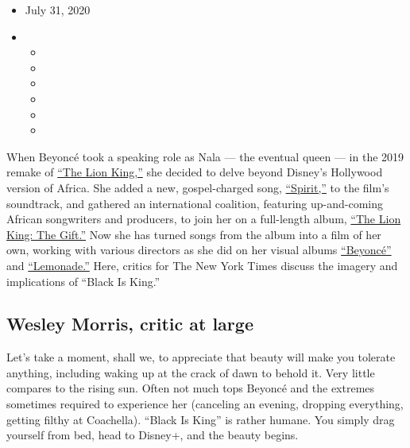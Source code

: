 \begin{itemize}
\item
  July 31, 2020
\item
  \begin{itemize}
  \item
  \item
  \item
  \item
  \item
  \item
  \end{itemize}
\end{itemize}

When Beyoncé took a speaking role as Nala --- the eventual queen --- in
the 2019 remake of
\href{https://www.nytimes.com/2019/07/11/movies/the-lion-king-review.html}{``The
Lion King,''} she decided to delve beyond Disney's Hollywood version of
Africa. She added a new, gospel-charged song,
\href{https://www.nytimes.com/2019/07/12/arts/music/playlist-beyonce-billie-eilish-justin-bieber-ed-sheeran.html}{``Spirit,''}
to the film's soundtrack, and gathered an international coalition,
featuring up-and-coming African songwriters and producers, to join her
on a full-length album,
\href{https://www.nytimes.com/2019/07/24/arts/music/beyonce-the-lion-king-the-gift-review.html}{``The
Lion King: The Gift.''} Now she has turned songs from the album into a
film of her own, working with various directors as she did on her visual
albums
\href{https://www.nytimes.com/2013/12/14/arts/music/beyonces-new-album-is-steamy-and-sleek.html}{``Beyoncé''}
and
\href{https://www.nytimes.com/2016/04/25/arts/music/beyonce-lemonade.html}{``Lemonade.''}
Here, critics for The New York Times discuss the imagery and
implications of ``Black Is King.''

\hypertarget{wesley-morris-critic-at-large}{%
\subsection{Wesley Morris, critic at
large}\label{wesley-morris-critic-at-large}}

Let's take a moment, shall we, to appreciate that beauty will make you
tolerate anything, including waking up at the crack of dawn to behold
it. Very little compares to the rising sun. Often not much tops Beyoncé
and the extremes sometimes required to experience her (canceling an
evening, dropping everything, getting filthy at Coachella). ``Black Is
King'' is rather humane. You simply drag yourself from bed, head to
Disney+, and the beauty begins.

